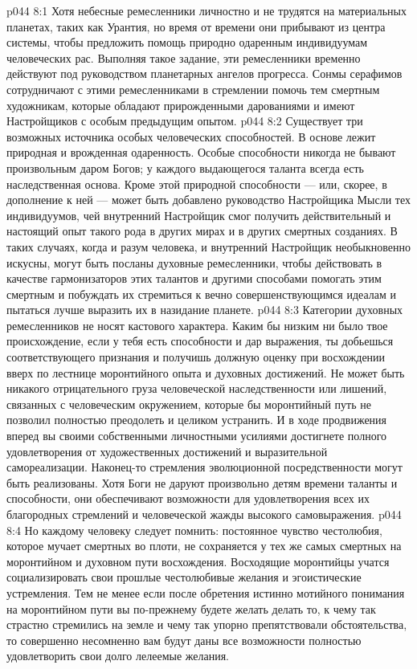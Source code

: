 \vs p044 8:1 Хотя небесные ремесленники личностно и не трудятся на материальных планетах, таких как Урантия, но время от времени они прибывают из центра системы, чтобы предложить помощь природно одаренным индивидуумам человеческих рас. Выполняя такое задание, эти ремесленники временно действуют под руководством планетарных ангелов прогресса. Сонмы серафимов сотрудничают с этими ремесленниками в стремлении помочь тем смертным художникам, которые обладают прирожденными дарованиями и имеют Настройщиков с особым предыдущим опытом.
\vs p044 8:2 Существует три возможных источника особых человеческих способностей. В основе  лежит природная и врожденная одаренность. Особые способности никогда не бывают произвольным даром Богов; у каждого выдающегося таланта всегда есть наследственная основа. Кроме этой природной способности --- или, скорее, в дополнение к ней --- может быть добавлено руководство Настройщика Мысли тех индивидуумов, чей внутренний Настройщик смог получить действительный и настоящий опыт такого рода в других мирах и в других смертных созданиях. В таких случаях, когда и разум человека, и внутренний Настройщик необыкновенно искусны, могут быть посланы духовные ремесленники, чтобы действовать в качестве гармонизаторов этих талантов и другими способами помогать этим смертным и побуждать их стремиться к вечно совершенствующимся идеалам и пытаться лучше выразить их в назидание планете.
\vs p044 8:3 \pc Категории духовных ремесленников не носят кастового характера. Каким бы низким ни было твое происхождение, если у тебя есть способности и дар выражения, ты добьешься соответствующего признания и получишь должную оценку при восхождении вверх по лестнице моронтийного опыта и духовных достижений. Не может быть никакого отрицательного груза человеческой наследственности или лишений, связанных с человеческим окружением, которые бы моронтийный путь не позволил полностью преодолеть и целиком устранить. И в ходе продвижения вперед вы своими собственными личностными усилиями достигнете полного удовлетворения от художественных достижений и выразительной самореализации. Наконец\hyp{}то стремления эволюционной посредственности могут быть реализованы. Хотя Боги не даруют произвольно детям времени таланты и способности, они обеспечивают возможности для удовлетворения всех их благородных стремлений и человеческой жажды высокого самовыражения.
\vs p044 8:4 Но каждому человеку следует помнить: постоянное чувство честолюбия, которое мучает смертных во плоти, не сохраняется у тех же самых смертных на моронтийном и духовном пути восхождения. Восходящие моронтийцы учатся социализировать свои прошлые честолюбивые желания и эгоистические устремления. Тем не менее если после обретения истинно мотийного понимания на моронтийном пути вы по\hyp{}прежнему будете желать делать то, к чему так страстно стремились на земле и чему так упорно препятствовали обстоятельства, то совершенно несомненно вам будут даны все возможности полностью удовлетворить свои долго лелеемые желания.
